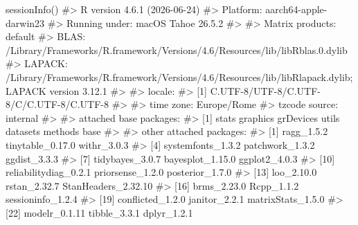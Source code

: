 \documentclass[
  italian,
  letterpaper,
  a4paper,
  11pt,
  open=any]{scrbook}
\newenvironment{Shaded}{\begin{snugshade}}{\end{snugshade}}
\newcommand{\CommentTok}[1]{\textcolor[rgb]{0.37,0.37,0.37}{#1}}
\newcommand{\FunctionTok}[1]{\textcolor[rgb]{0.28,0.35,0.67}{#1}}
\newcommand{\NormalTok}[1]{\textcolor[rgb]{0.00,0.23,0.31}{#1}}
\theoremstyle{plain}
\theoremstyle{definition}
\theoremstyle{definition}
\theoremstyle{remark}
\begin{document}
\begin{tcolorbox}[enhanced jigsaw, arc=.35mm, bottomrule=.15mm, bottomtitle=1mm, breakable, colback=white, colbacktitle=quarto-callout-caution-color!10!white, colframe=quarto-callout-caution-color-frame, coltitle=black, left=2mm, leftrule=.75mm, opacityback=0, opacitybacktitle=0.6, rightrule=.15mm, title=\textcolor{quarto-callout-caution-color}{\faFire}\hspace{0.5em}{Informazioni sull'ambiente di sviluppo}, titlerule=0mm, toprule=.15mm, toptitle=1mm]

\begin{Shaded}
\begin{Highlighting}[]
\FunctionTok{sessionInfo}\NormalTok{()}
\CommentTok{\#\textgreater{} R version 4.6.1 (2026{-}06{-}24)}
\CommentTok{\#\textgreater{} Platform: aarch64{-}apple{-}darwin23}
\CommentTok{\#\textgreater{} Running under: macOS Tahoe 26.5.2}
\CommentTok{\#\textgreater{} }
\CommentTok{\#\textgreater{} Matrix products: default}
\CommentTok{\#\textgreater{} BLAS:   /Library/Frameworks/R.framework/Versions/4.6/Resources/lib/libRblas.0.dylib }
\CommentTok{\#\textgreater{} LAPACK: /Library/Frameworks/R.framework/Versions/4.6/Resources/lib/libRlapack.dylib;  LAPACK version 3.12.1}
\CommentTok{\#\textgreater{} }
\CommentTok{\#\textgreater{} locale:}
\CommentTok{\#\textgreater{} [1] C.UTF{-}8/UTF{-}8/C.UTF{-}8/C/C.UTF{-}8/C.UTF{-}8}
\CommentTok{\#\textgreater{} }
\CommentTok{\#\textgreater{} time zone: Europe/Rome}
\CommentTok{\#\textgreater{} tzcode source: internal}
\CommentTok{\#\textgreater{} }
\CommentTok{\#\textgreater{} attached base packages:}
\CommentTok{\#\textgreater{} [1] stats     graphics  grDevices utils     datasets  methods   base     }
\CommentTok{\#\textgreater{} }
\CommentTok{\#\textgreater{} other attached packages:}
\CommentTok{\#\textgreater{}  [1] ragg\_1.5.2            tinytable\_0.17.0      withr\_3.0.3          }
\CommentTok{\#\textgreater{}  [4] systemfonts\_1.3.2     patchwork\_1.3.2       ggdist\_3.3.3         }
\CommentTok{\#\textgreater{}  [7] tidybayes\_3.0.7       bayesplot\_1.15.0      ggplot2\_4.0.3        }
\CommentTok{\#\textgreater{} [10] reliabilitydiag\_0.2.1 priorsense\_1.2.0      posterior\_1.7.0      }
\CommentTok{\#\textgreater{} [13] loo\_2.10.0            rstan\_2.32.7          StanHeaders\_2.32.10  }
\CommentTok{\#\textgreater{} [16] brms\_2.23.0           Rcpp\_1.1.2            sessioninfo\_1.2.4    }
\CommentTok{\#\textgreater{} [19] conflicted\_1.2.0      janitor\_2.2.1         matrixStats\_1.5.0    }
\CommentTok{\#\textgreater{} [22] modelr\_0.1.11         tibble\_3.3.1          dplyr\_1.2.1          }

\end{Highlighting}
\end{Shaded}
\end{tcolorbox}
\end{document}
